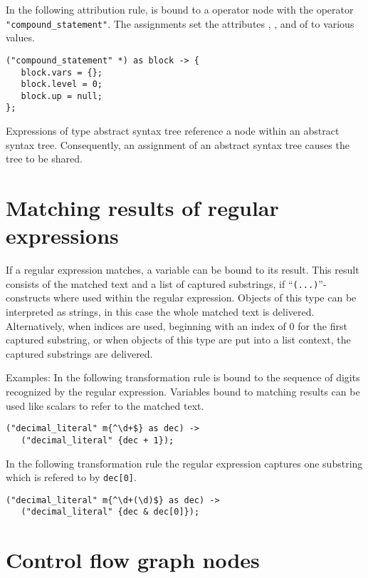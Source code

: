 \noindent
In the following attribution rule,  is bound
to a operator node with the operator \lstinline!"compound_statement"!.
The assignments set the attributes , , and
 of  to various values.

\begin{lstlisting}
("compound_statement" *) as block -> {
   block.vars = {};
   block.level = 0;
   block.up = null;
};
\end{lstlisting}

\noindent
Expressions of type abstract syntax tree reference a node within an
abstract syntax tree. Consequently, an assignment of an abstract syntax
tree causes the tree to be shared.

\section{Matching results of regular expressions}\label{matchresult}

If a regular expression matches, a variable can be bound to its
result. This result consists of the matched text and a list
of captured substrings, if ``\lstinline!(...)!''-constructs
where used within the regular expression. Objects of this
type can be interpreted as strings, in this case the whole
matched text is delivered. Alternatively, when indices are
used, beginning with an index of 0 for the first captured substring,
or when objects of this type are put into a list context,
the captured substrings are delivered.

Examples: In the following transformation rule
 is bound to the sequence of digits recognized by the
regular expression. Variables bound to matching results can be
used like scalars to refer to the matched text.

\begin{lstlisting}
("decimal_literal" m{^\d+$} as dec) ->
   ("decimal_literal" {dec + 1});
\end{lstlisting}%

\noindent
In the following transformation rule the regular expression
captures one substring which is refered to by \lstinline!dec[0]!.

\begin{lstlisting}
("decimal_literal" m{^\d+(\d)$} as dec) ->
   ("decimal_literal" {dec & dec[0]});
\end{lstlisting}%

\section{Control flow graph nodes}

